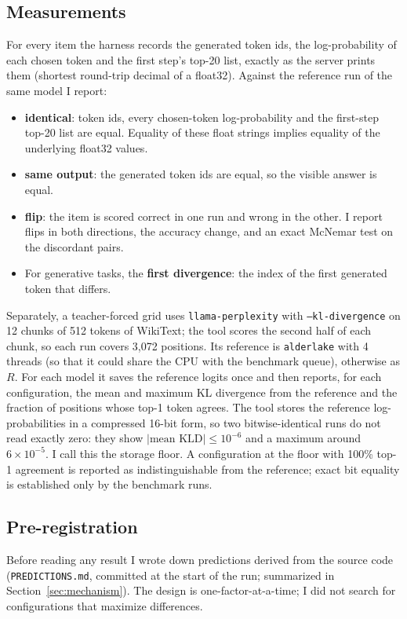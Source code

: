 \subsection{Measurements}
For every item the harness records the generated token ids, the log-probability of each chosen
token and the first step's top-20 list, exactly as the server prints them (shortest
round-trip decimal of a float32). Against the reference run of the same model I report:
\begin{itemize}
\item \textbf{identical}: token ids, every chosen-token log-probability and the first-step
top-20 list are equal. Equality of these float strings implies equality of the underlying
float32 values.
\item \textbf{same output}: the generated token ids are equal, so the visible answer is equal.
\item \textbf{flip}: the item is scored correct in one run and wrong in the other. I report flips
in both directions, the accuracy change, and an exact McNemar test on the discordant pairs.
\item For generative tasks, the \textbf{first divergence}: the index of the first generated
token that differs.
\end{itemize}

Separately, a teacher-forced grid uses \texttt{llama-perplexity} with \texttt{--kl-divergence}
on 12 chunks of 512 tokens of WikiText; the tool scores the second half of each chunk, so each
run covers 3,072 positions. Its reference is \texttt{alderlake} with 4 threads (so that it could
share the CPU with the benchmark queue), otherwise as $R$. For each model it saves the reference
logits once and then reports, for each configuration, the mean and maximum KL divergence from
the reference and the fraction of positions whose top-1 token agrees. The tool stores the
reference log-probabilities in a compressed 16-bit form, so two bitwise-identical runs do not
read exactly zero: they show $|\text{mean KLD}|\le10^{-6}$ and a maximum around $6\times10^{-5}$.
I call this the storage floor. A configuration at the floor with 100\% top-1 agreement is
reported as indistinguishable from the reference; exact bit equality is established only by the
benchmark runs.

\subsection{Pre-registration}
Before reading any result I wrote down predictions derived from the source code
(\texttt{PREDICTIONS.md}, committed at the start of the run; summarized in
Section~\ref{sec:mechanism}). The design is one-factor-at-a-time; I did not search for
configurations that maximize differences.
